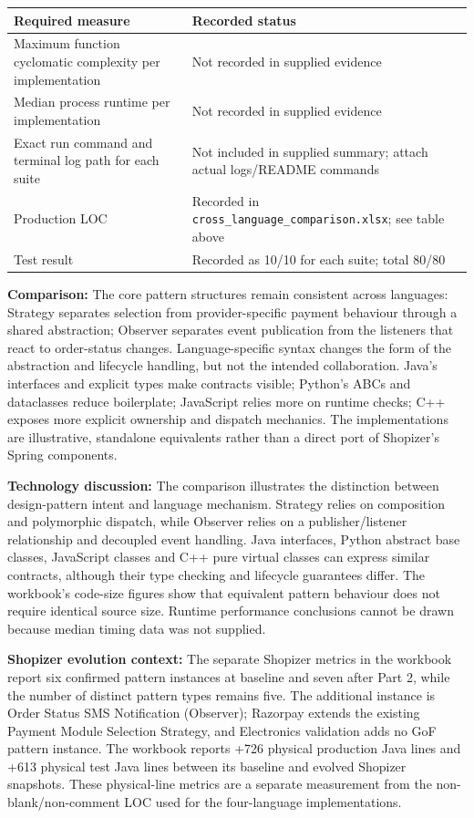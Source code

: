 \documentclass[11pt,a4paper]{article}
\newcommand{\tsmall}{\small\setlength{\tabcolsep}{3pt}}
\begin{document}
\begingroup\tsmall
\begin{longtable}{@{}P{6.4cm}P{9.5cm}@{}}
\toprule
\textbf{Required measure} & \textbf{Recorded status}\\
\midrule
\endhead
Maximum function cyclomatic complexity per implementation & Not recorded in supplied evidence\\
Median process runtime per implementation & Not recorded in supplied evidence\\
Exact run command and terminal log path for each suite & Not included in supplied summary; attach actual logs/README commands\\
Production LOC & Recorded in \texttt{cross\_\allowbreak{}language\_\allowbreak{}comparison.\allowbreak{}xlsx}; see table above\\
Test result & Recorded as 10/10 for each suite; total 80/80\\
\bottomrule
\end{longtable}
\endgroup

\textbf{Comparison:} The core pattern structures remain consistent across languages: Strategy separates selection from provider-specific payment behaviour through a shared abstraction; Observer separates event publication from the listeners that react to order-status changes. Language-specific syntax changes the form of the abstraction and lifecycle handling, but not the intended collaboration. Java's interfaces and explicit types make contracts visible; Python's ABCs and dataclasses reduce boilerplate; JavaScript relies more on runtime checks; C++ exposes more explicit ownership and dispatch mechanics. The implementations are illustrative, standalone equivalents rather than a direct port of Shopizer's Spring components.

\textbf{Technology discussion:} The comparison illustrates the distinction between design-pattern intent and language mechanism. Strategy relies on composition and polymorphic dispatch, while Observer relies on a publisher/listener relationship and decoupled event handling. Java interfaces, Python abstract base classes, JavaScript classes and C++ pure virtual classes can express similar contracts, although their type checking and lifecycle guarantees differ. The workbook's code-size figures show that equivalent pattern behaviour does not require identical source size. Runtime performance conclusions cannot be drawn because median timing data was not supplied.

\textbf{Shopizer evolution context:} The separate Shopizer metrics in the workbook report six confirmed pattern instances at baseline and seven after Part 2, while the number of distinct pattern types remains five. The additional instance is Order Status SMS Notification (Observer); Razorpay extends the existing Payment Module Selection Strategy, and Electronics validation adds no GoF pattern instance. The workbook reports +726 physical production Java lines and +613 physical test Java lines between its baseline and evolved Shopizer snapshots. These physical-line metrics are a separate measurement from the non-blank/non-comment LOC used for the four-language implementations.
\end{document}
